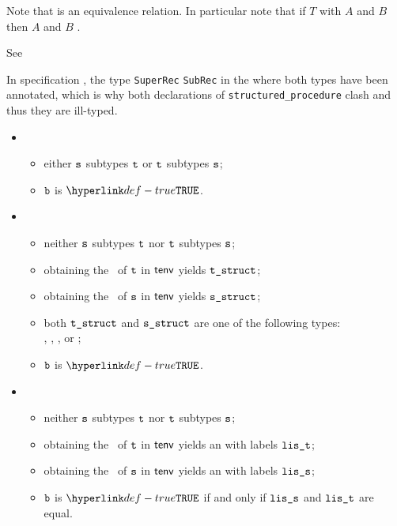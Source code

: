    
Note that \Prosetypeclashing{} is an equivalence relation.
In particular note that if $T$ \Prosetypeclashes{} with $A$ and $B$ then $A$ and
$B$ \Prosetypeclash{}.

See 

In specification , the type \verb|SuperRec| \emph{\Prosetypeclashes} \verb|SubRec|
in the \staticenvironmentterm{} where both types have been annotated,
which is why both declarations of \verb|structured_procedure| clash and thus they are ill-typed.

\ProseParagraph
\OneApplies
\begin{itemize}
  \item {}
  \begin{itemize}
    \item either $\texttt{s}$ subtypes $\texttt{t}$ or $\texttt{t}$ subtypes $\texttt{s}$;
    \item $\texttt{b}$ is $\True$.
  \end{itemize}

  \item {}
  \begin{itemize}
    \item neither $\texttt{s}$ subtypes $\texttt{t}$ nor $\texttt{t}$ subtypes $\texttt{s}$;
    \item obtaining the \structure\ of $\texttt{t}$ in $\textsf{tenv}$ yields $\texttt{t\_struct}$\ProseOrTypeError;
    \item obtaining the \structure\ of $\texttt{s}$ in $\textsf{tenv}$ yields $\texttt{s\_struct}$\ProseOrTypeError;
    \item both $\texttt{t\_struct}$ and $\texttt{s\_struct}$ are one of the following types: \\
          \booleantypesterm{}, \integertypeterm{}, \realtypeterm{}, or \stringtypeterm{};
    \item $\texttt{b}$ is $\True$.
  \end{itemize}

  \item {}
  \begin{itemize}
    \item neither $\texttt{s}$ subtypes $\texttt{t}$ nor $\texttt{t}$ subtypes $\texttt{s}$;
    \item obtaining the \structure\ of $\texttt{t}$ in $\textsf{tenv}$ yields an \enumerationtypeterm{} with labels $\texttt{lis\_t}$;
    \item obtaining the \structure\ of $\texttt{s}$ in $\textsf{tenv}$ yields an \enumerationtypeterm{} with labels $\texttt{lis\_s}$;
    \item $\texttt{b}$ is $\True$ if and only if $\texttt{lis\_s}$ and $\texttt{lis\_t}$ are equal.
  \end{itemize}


\end{itemize}
